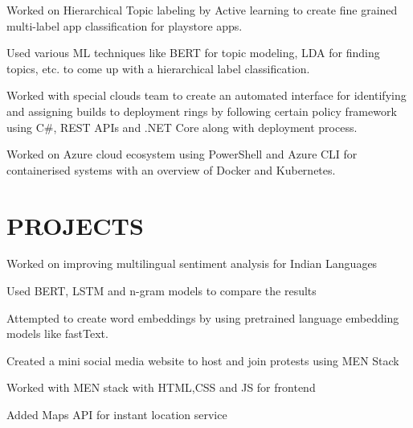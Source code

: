 \documentclass[]{deedy-resume-openfont}
\begin{document}
\begin{minipage}[t]{0.66\textwidth}
\begin{tightemize}
\item Worked on Hierarchical Topic labeling by Active learning to create fine grained multi-label app classification for playstore apps.
\item Used various ML techniques like BERT for topic modeling, LDA for finding topics, etc. to come up with a hierarchical label classification.
\end{tightemize}

\begin{tightemize}
\item Worked with special clouds team to create an automated interface for identifying and assigning builds to deployment rings by following certain policy framework using C\#, REST APIs and .NET Core along with deployment process.
\item Worked on Azure cloud ecosystem using PowerShell and Azure CLI for containerised systems with an overview of Docker and Kubernetes.
\end{tightemize}



\section{PROJECTS}
\begin{tightemize}
\item Worked on improving multilingual sentiment analysis for Indian Languages
\item Used BERT, LSTM and n-gram models to compare the results
\item Attempted to create word embeddings by using pretrained language embedding models like fastText.
\end{tightemize}

\begin{tightemize}
\item Created a mini social media website to host and join protests using MEN Stack
\item Worked with MEN stack with HTML,CSS and JS for frontend
\item Added Maps API for instant location service
\end{tightemize}


\end{minipage}
\end{document}
